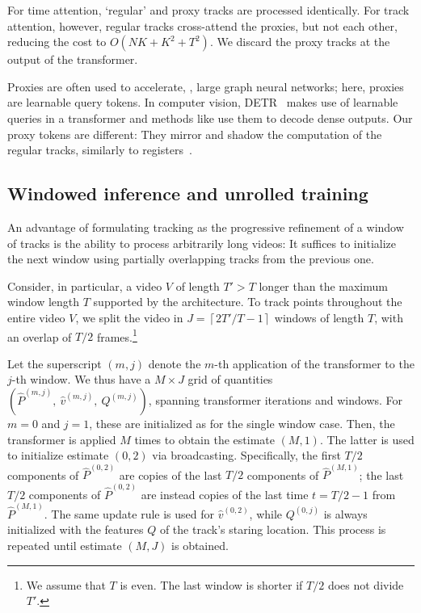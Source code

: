 

For time attention, `regular' and proxy tracks are processed identically.
For track attention, however, regular tracks cross-attend the proxies, but not each other, reducing the cost to $O(NK + K^2 + T^2)$.
 We discard the proxy tracks at the output of the transformer. 

Proxies are often used to accelerate, \eg, large graph neural networks; here, proxies are learnable query tokens.
In computer vision, DETR~\cite{carion20end-to-end} makes use of learnable queries in a transformer and methods like {}\cite{jaegle22perceiver} use them to decode dense outputs.
Our proxy tokens are different: They mirror and shadow the computation of the regular tracks, similarly to registers~\cite{darcet2023vision}.

\subsection{Windowed inference and unrolled training}%
\label{sec:unrolled_training}

An advantage of formulating tracking as the progressive refinement of a window of tracks is the ability to process arbitrarily long videos:
It suffices to initialize the next window using partially overlapping tracks from the previous one.


Consider, in particular, a video $V$ of length $T' > T$ longer than the maximum window length $T$ supported by the architecture.
To track points throughout the entire video $V$, we split the video in
$J = \left\lceil 2T'/T - 1 \right\rceil$ windows of length $T$, with an overlap of $T/2$ frames.\footnote{We assume that $T$ is even. The last window is shorter if $T/2$ does not divide $T'$.}

Let the superscript $(m,j)$ denote the $m$-th application of the transformer to the $j$-th window.
We thus have a $M \times J$ grid of quantities
$
(
  \hat P^{(m,j)},~
  \hat v^{(m,j)},~
  Q^{(m,j)}
)
$,
spanning transformer iterations and windows.
For $m=0$ and $j=1$, these are initialized as for the single window case.
Then, the transformer is applied $M$ times to obtain the estimate $(M,1)$.
The latter is used to initialize estimate $(0,2)$ via broadcasting.
Specifically, the first $T/2$ components of $\hat P^{(0,2)}$ are copies of the last $T/2$ components of $\hat P^{(M,1)}$; the last $T/2$ components of $\hat P^{(0,2)}$ are instead copies of the last time $t=T/2-1$ from $\hat P^{(M,1)}$.
The same update rule is used for
$
\hat v^{(0,2)}
$,
while
$
Q^{(0,j)}
$
is always initialized with the features $Q$ of the track's staring location.
This process is repeated until estimate $(M,J)$ is obtained.

